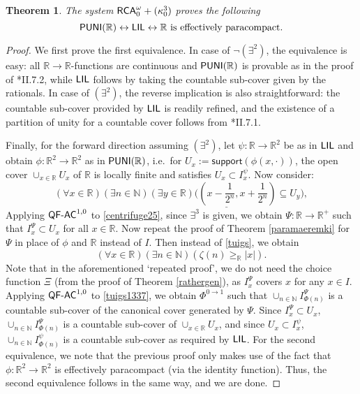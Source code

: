 \documentclass[reqno]{amsart}
\newtheorem{thm}{Theorem}
\newcommand\be{\begin{equation}}
\newcommand\ee{\end{equation}}
\def\RCA{\textup{\textsf{RCA}}}
\def\N{{\mathbb  N}}
\def\R{{\mathbb  R}}
\def\di{\rightarrow}
\def\asa{\leftrightarrow}
\def\PUNI{\textup{\textsf{PUNI}}}
\def\QFAC{\textup{\textsf{QF-AC}}}
\def\LIL{\textup{\textsf{LIL}}}
\numberwithin{equation}{section}
\numberwithin{thm}{section}
\begin{document}
\begin{thm}\label{kokken327}
The system $\RCA_{0}^{\omega}+(\kappa_{0}^{3})$ proves the following 
\[
\PUNI(\R)\asa \LIL\asa \textup{$\R$ is effectively paracompact}.
\]
\end{thm}
\begin{proof}
We first prove the first equivalence.
In case of $\neg(\exists^{2})$, the equivalence is easy: all $\R\di \R$-functions are continuous and $\PUNI(\R)$ is provable as in the proof of \cite{simpson2}*{II.7.2}, while $\LIL$ follows by taking the countable sub-cover given by the rationals. 
In case of $(\exists^{2})$, the reverse implication is also straightforward: the countable sub-cover provided by $\LIL$ is readily refined, and the existence of a partition 
of unity for a countable cover follows from \cite{simpson2}*{II.7.1}. 

\smallskip

Finally, for the forward direction assuming $(\exists^{2})$, let $\psi:\R\di \R^{2}$ be as in $\LIL$ and obtain $\phi:\R^{2}\di \R^{2}$ as in $\PUNI(\R)$, i.e.\ for $U_{x}:=\textsf{support}(\phi(x, \cdot))$, 
the open cover $\cup_{x\in \R }U_{x}$ of $\R$ is locally finite and satisfies $U_{x}\subset I_{x}^{\psi}$.  Now consider:
\be\label{centrifuge25}\textstyle
(\forall x\in \R)(\exists n\in \N)\underline{(\exists y\in \R)\big((x-\frac{1}{2^{n}}, x+\frac{1}{2^{n}})\subseteq U_{y}\big)}, 
\ee
Applying $\QFAC^{1,0}$ to \eqref{centrifuge25}, since $\exists^{3}$ is given, we obtain $\Psi:\R\di \R^{+}$ such that $I_{x}^{\Psi}\subset U_{x}$ for all $x\in \R$. 
Now repeat the proof of Theorem \ref{paramaeremki} for $\Psi$ in place of $\phi$ and $\R$ instead of $I$.
Then instead of \eqref{tuigs}, we obtain
\be\label{tuigs1337}
(\forall x\in \R )(\exists n\in \N)(\zeta(n)\geq _{\R}|x|).
\ee
Note that in the aforementioned `repeated proof', we do not need the choice function $\Xi$ (from the proof of Theorem \ref{rathergen}), as $I_{x}^{\Psi}$ covers $x$ for any $x\in I$.  
Applying $\QFAC^{1,0}$ to \eqref{tuigs1337}, we obtain $\Phi^{0\di 1}$ such that $\cup_{n\in \N}I_{\Phi(n)}^{\Psi}$ is a countable sub-cover of the canonical cover generated by $\Psi$.
Since $I_{x}^{\Psi}\subset U_{x}$, $\cup_{n\in \N}I_{\Phi(n)}^{\Psi}$ is a countable sub-cover of $\cup_{x\in \R}U_{x}$, and since $U_{x}\subset I_{x}^{\psi}$, $\cup_{n\in \N}I_{\Phi(n)}^{\psi}$ is a countable sub-cover as required by $\LIL$.  For the second equivalence, we note that the previous proof only makes use of the fact that $\phi:\R^{2}\di \R^{2}$ is effectively paracompact (via the identity function).  
Thus, the second equivalence follows in the same way, and we are done. 
\end{proof}
\end{document}
